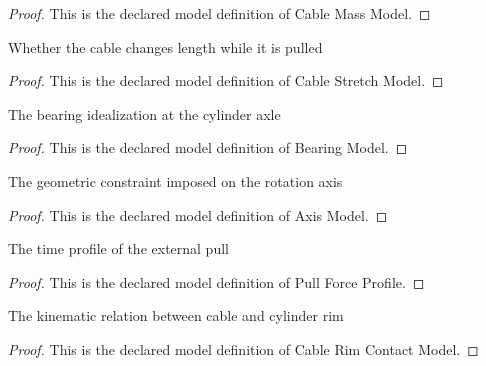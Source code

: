 \begin{proof}
  This is the declared model definition of Cable Mass Model.
\end{proof}
\begin{definition}
  \label{def:physics:phyx-mini-0820:phyxminiproblems-problemphyxmini0820-cablestretchmodel}
  Whether the cable changes length while it is pulled
\end{definition}
\begin{proof}
  This is the declared model definition of Cable Stretch Model.
\end{proof}
\begin{definition}
  \label{def:physics:phyx-mini-0820:phyxminiproblems-problemphyxmini0820-bearingmodel}
  The bearing idealization at the cylinder axle
\end{definition}
\begin{proof}
  This is the declared model definition of Bearing Model.
\end{proof}
\begin{definition}
  \label{def:physics:phyx-mini-0820:phyxminiproblems-problemphyxmini0820-axismodel}
  The geometric constraint imposed on the rotation axis
\end{definition}
\begin{proof}
  This is the declared model definition of Axis Model.
\end{proof}
\begin{definition}
  \label{def:physics:phyx-mini-0820:phyxminiproblems-problemphyxmini0820-pullforceprofile}
  The time profile of the external pull
\end{definition}
\begin{proof}
  This is the declared model definition of Pull Force Profile.
\end{proof}
\begin{definition}
  \label{def:physics:phyx-mini-0820:phyxminiproblems-problemphyxmini0820-cablerimcontactmodel}
  The kinematic relation between cable and cylinder rim
\end{definition}
\begin{proof}
  This is the declared model definition of Cable Rim Contact Model.
\end{proof}
